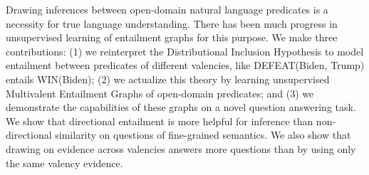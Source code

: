 Drawing inferences between open-domain natural language predicates is a necessity for true language understanding. There has been much progress in unsupervised learning of entailment graphs for this purpose. We make three contributions: (1) we reinterpret the Distributional Inclusion Hypothesis to model entailment between predicates of different valencies, like DEFEAT(Biden, Trump) entails WIN(Biden); (2) we actualize this theory by learning unsupervised Multivalent Entailment Graphs of open-domain predicates; and (3) we demonstrate the capabilities of these graphs on a novel question answering task. We show that directional entailment is more helpful for inference than non-directional similarity on questions of fine-grained semantics. We also show that drawing on evidence across valencies answers more questions than by using only the same valency evidence.
